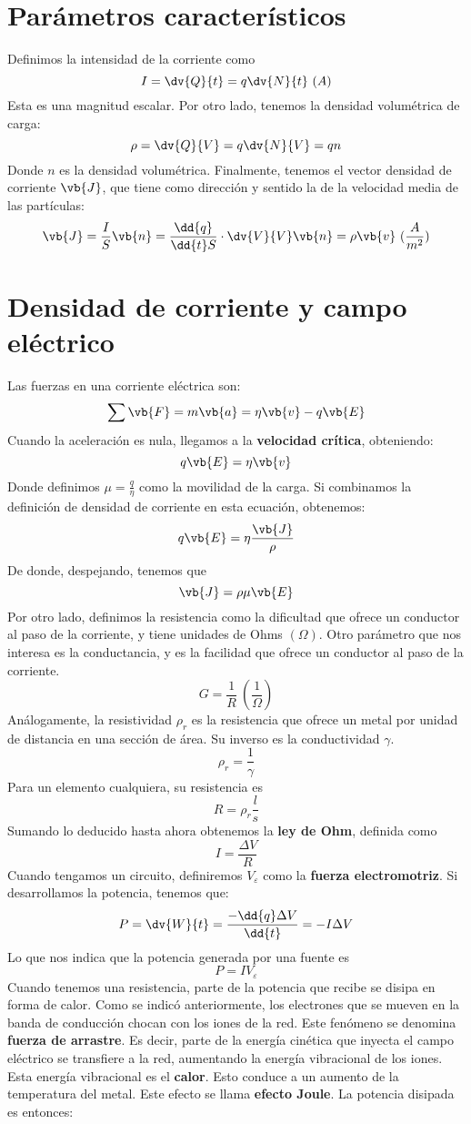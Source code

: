 \documentclass{./FisicaII.tex}
\begin{document}
\section{Parámetros característicos}
Definimos la intensidad de la corriente como
\[
	I = \dv{Q}{t} = q\dv{N}{t}~(A)
\]
Esta es una magnitud escalar. Por otro lado, tenemos la densidad volumétrica de carga:
\[
	\rho = \dv{Q}{V} = q\dv{N}{V} = qn
\]
Donde $n$ es la densidad volumétrica. Finalmente, tenemos el vector densidad de corriente $\vb{J}$, que tiene como dirección y sentido la de la velocidad media de las partículas:
\[
	\vb{J} = \frac{I}{S}\vb{n} = \frac{\dd{q}}{\dd{t}S}\cdot \dv{V}{V} \vb{n} = \rho \vb{v}~(\frac{A}{m ^{2}})
\]
\section{Densidad de corriente y campo eléctrico}
Las fuerzas en una corriente eléctrica son:
\[
	\sum \vb{F} = m \vb{a} = \eta \vb{v} -q \vb{E}
\]
Cuando la aceleración es nula, llegamos a la \textbf{velocidad crítica}, obteniendo:
\[
	q \vb{E} = \eta \vb{v}
\]
Donde definimos $\mu = \frac{q}{\eta}$ como la movilidad de la carga. Si combinamos la definición de densidad de corriente en esta ecuación, obtenemos:
\[
	q \vb{E} = \eta \frac{\vb{J}}{\rho}
\]
De donde, despejando, tenemos que
\[
	\vb{J} = \rho \mu \vb{E}
\]
Por otro lado, definimos la resistencia como la dificultad que ofrece un conductor al paso de la corriente, y tiene unidades de Ohms $(\Omega)$. Otro parámetro que nos interesa es la conductancia, y es la facilidad que ofrece un conductor al paso de la corriente. 
\[
	G = \frac{1}{R} ~(\frac{1}{\Omega})
\]
Análogamente, la resistividad $\rho_{r}$ es la resistencia que ofrece un metal por unidad de distancia en una sección de área. Su inverso es la conductividad $\gamma$.  
\[
	\rho_{r} = \frac{1}{\gamma}
\]
Para un elemento cualquiera, su resistencia es
\[
	\boxed{
		R = \rho_{r} \frac{l}{s}
	}
\]
Sumando lo deducido hasta ahora obtenemos la \textbf{ley de Ohm}, definida como
\[
	I = \frac{\Delta V}{R}
\]
Cuando tengamos un circuito, definiremos $V_{\varepsilon}$ como la \textbf{fuerza electromotriz}. Si desarrollamos la potencia, tenemos que:
\[
	P = \dv{W}{t} = \frac{-\dd{q} \Delta V}{\dd{t}} = -I \Delta V
\]
Lo que nos indica que la potencia generada por una fuente es
\[
	P = I V_{\varepsilon}
\]
Cuando tenemos una resistencia, parte de la potencia que recibe se disipa en forma de calor. Como se indicó anteriormente, los electrones que se mueven en la banda de conducción chocan con los iones de la red. Este fenómeno se denomina \textbf{fuerza de arrastre}. Es decir, parte de la energía cinética que inyecta el campo eléctrico se transfiere a la red, aumentando la energía vibracional de los iones. Esta energía vibracional es el \textbf{calor}. Esto conduce a un aumento de la temperatura del metal. Este efecto se llama \textbf{efecto Joule}. La potencia disipada es entonces:
\end{document}
